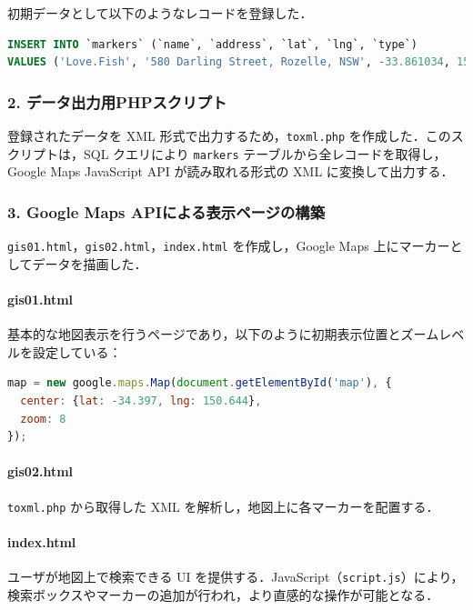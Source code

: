 初期データとして以下のようなレコードを登録した．

\begin{lstlisting}[language=SQL]
INSERT INTO `markers` (`name`, `address`, `lat`, `lng`, `type`)
VALUES ('Love.Fish', '580 Darling Street, Rozelle, NSW', -33.861034, 151.171936, 'restaurant');
\end{lstlisting}

\subsubsection*{2. データ出力用PHPスクリプト}

登録されたデータを XML 形式で出力するため，\texttt{toxml.php} を作成した．このスクリプトは，SQL クエリにより \texttt{markers} テーブルから全レコードを取得し，Google Maps JavaScript API が読み取れる形式の XML に変換して出力する．

\subsubsection*{3. Google Maps APIによる表示ページの構築}

\texttt{gis01.html}，\texttt{gis02.html}，\texttt{index.html} を作成し，Google Maps 上にマーカーとしてデータを描画した．

\paragraph*{gis01.html}
基本的な地図表示を行うページであり，以下のように初期表示位置とズームレベルを設定している：

\begin{lstlisting}[language=javascript]
map = new google.maps.Map(document.getElementById('map'), {
  center: {lat: -34.397, lng: 150.644},
  zoom: 8
});
\end{lstlisting}

\paragraph*{gis02.html}
\texttt{toxml.php} から取得した XML を解析し，地図上に各マーカーを配置する．

\paragraph*{index.html}
ユーザが地図上で検索できる UI を提供する．JavaScript（\texttt{script.js}）により，検索ボックスやマーカーの追加が行われ，より直感的な操作が可能となる．

